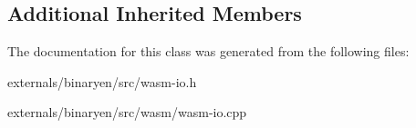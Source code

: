 \subsection*{Additional Inherited Members}


The documentation for this class was generated from the following files\+:\begin{DoxyCompactItemize}
\item 
externals/binaryen/src/wasm-\/io.\+h\item 
externals/binaryen/src/wasm/wasm-\/io.\+cpp\end{DoxyCompactItemize}
